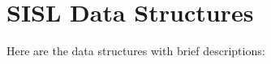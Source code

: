 \section{SISL Data Structures}
Here are the data structures with brief descriptions:\begin{CompactList}
\item{}
\end{CompactList}
